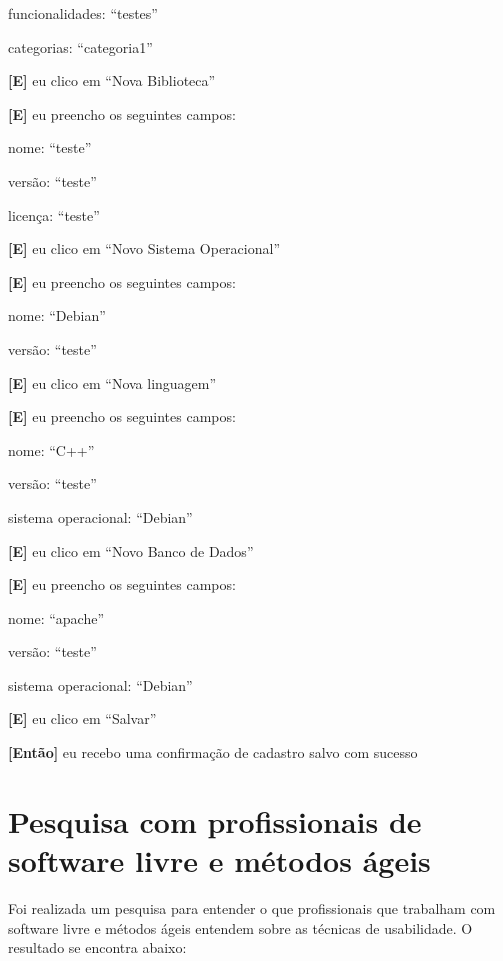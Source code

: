 \begin{itemize}
        \subitem funcionalidades: ``testes''

        \subitem categorias: ``categoria1''
    
    \textbf{[E]} eu clico em ``Nova Biblioteca''

    \textbf{[E]} eu preencho os seguintes campos: 

        \subitem nome: ``teste''

        \subitem versão: ``teste''

        \subitem licença: ``teste''

    \textbf{[E]} eu clico em ``Novo Sistema Operacional''

    \textbf{[E]} eu preencho os seguintes campos: 

        \subitem nome: ``Debian''

        \subitem versão: ``teste''

    \textbf{[E]} eu clico em ``Nova linguagem''

    \textbf{[E]} eu preencho os seguintes campos: 

        \subitem nome: ``C++''

        \subitem versão: ``teste''

        \subitem sistema operacional: ``Debian''

    \textbf{[E]} eu clico em ``Novo Banco de Dados''

    \textbf{[E]} eu preencho os seguintes campos: 

        \subitem nome: ``apache''

        \subitem versão: ``teste''

        \subitem sistema operacional: ``Debian''

    \textbf{[E]} eu clico em ``Salvar''

    \textbf{[Então]} eu recebo uma confirmação de cadastro salvo com sucesso
    
    
\end{itemize}

\newpage

\section{Pesquisa com profissionais de software livre e métodos ágeis}

	Foi realizada um pesquisa para entender o que profissionais que trabalham com software livre e métodos ágeis entendem sobre as técnicas de usabilidade. O resultado se encontra abaixo:

